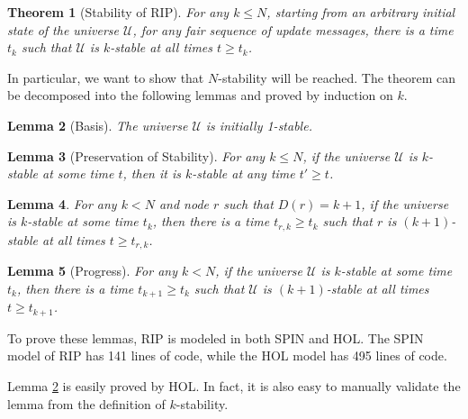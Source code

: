 \documentclass[a4paper,10pt,twocolumn]{article}
\newtheorem{theorem}{Theorem}
\newtheorem{lemma}[theorem]{Lemma}
\begin{document}
\begin{theorem}[Stability of RIP]\label{BOG02:Thm6}
For any $k \leq N$, starting from an arbitrary initial state of the universe $\mathcal{U}$, for any fair sequence of update messages, there is a time $t_k$ such that $\mathcal{U}$ is $k$-stable at all times $t \geq t_k$.
\end{theorem}
In particular, we want to show that $N$-stability will be reached. The theorem can be decomposed into the following lemmas and proved by induction on $k$.
\begin{lemma}[Basis]\label{BOG02:Lem7}
The universe $\mathcal{U}$ is initially 1-stable.
\end{lemma}
\begin{lemma}[Preservation of Stability]\label{BOG02:Lem8}
For any $k\leq N$, if the universe $\mathcal{U}$ is $k$-stable at some time $t$, then it is $k$-stable at any time $t' \geq t$.
\end{lemma}
\begin{lemma}\label{BOG02:Lem9}
For any $k<N$ and node $r$ such that $D(r)=k+1$, if the universe is $k$-stable at some time $t_k$, then there is a time $t_{r,k} \geq t_k$ such that $r$ is $(k+1)$-stable at all times $t \geq t_{r,k}$.
\end{lemma}
\begin{lemma}[Progress]\label{BOG02:Lem10}
For any $k<N$, if the universe $\mathcal{U}$ is $k$-stable at some time $t_k$, then there is a time $t_{k+1} \geq t_k$ such that $\mathcal{U}$ is $(k+1)$-stable at all times $t \geq t_{k+1}$.
\end{lemma}

To prove these lemmas, RIP is modeled in both SPIN and HOL. The SPIN model of RIP has 141 lines of code, while the HOL model has 495 lines of code.

Lemma \ref{BOG02:Lem7} is easily proved by HOL. In fact, it is also easy to manually validate the lemma from the definition of $k$-stability.
\end{document}
